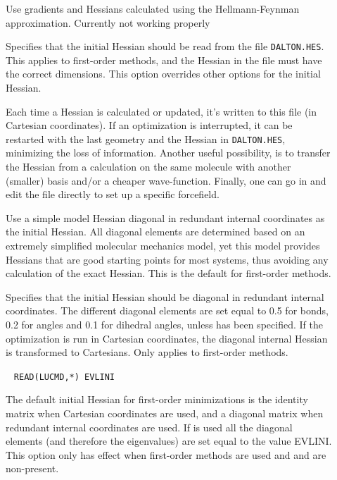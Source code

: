 \begin{description}
\item[]
Use gradients and Hessians calculated using the Hellmann-Feynman
approximation. Currently not working properly

\item[]
Specifies that the initial Hessian should be
read from the file \verb|DALTON.HES|. This applies to first-order
methods, and the Hessian in the file must have the correct
dimensions. This option overrides other options for the initial
Hessian.

Each time a Hessian is calculated or updated,
it's written to this file (in Cartesian coordinates). If an
optimization is interrupted, it can be restarted with the 
last geometry and the Hessian in \verb|DALTON.HES|, minimizing the
loss of information. Another useful possibility, is to transfer
the Hessian from a calculation on the same molecule with another
(smaller) basis and/or a cheaper wave-function. Finally, one can go in
and edit the file directly to set up a specific forcefield.

\item[]
Use a simple model Hessian\cite{rlabgkpamcpl241} diagonal in redundant
internal coordinates as the initial Hessian. All diagonal elements are
determined based on an extremely simplified molecular mechanics model,
yet this model provides Hessians that are good starting points for
most systems, thus avoiding any calculation of the exact Hessian. This
is the default for first-order methods.

\item[]
Specifies that the initial Hessian should
be diagonal in redundant internal coordinates. The different diagonal
elements are set equal to 0.5 for bonds, 0.2 for angles and 0.1 for
dihedral angles, unless  has been specified. If the
optimization is run in Cartesian coordinates, the diagonal internal
Hessian is transformed to Cartesians. Only applies to first-order
methods.

\item[]\verb| |
\newline
\verb|READ(LUCMD,*) EVLINI|

The default initial Hessian for first-order
minimizations is the
identity matrix when Cartesian coordinates are used, and a diagonal
matrix when redundant internal coordinates are used. If 
is used all the diagonal elements (and therefore the eigenvalues) are
set equal to the value EVLINI. This option only has effect when
first-order methods are used and  and  are
non-present.


\end{description}

